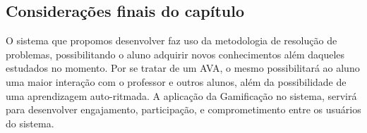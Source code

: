 

\subsection{Considerações finais do cap\'itulo}

O sistema que propomos desenvolver faz uso da metodologia de resolução de problemas, possibilitando o aluno adquirir novos conhecimentos além daqueles estudados no momento. Por se tratar de um AVA, 
o mesmo possibilitará ao aluno uma maior interação com o professor e outros alunos, além da possibilidade de uma aprendizagem auto-ritmada. A aplicação da Gamificação no sistema, servir\'a para 
desenvolver  engajamento, participação, e comprometimento entre os usuários do sistema. 